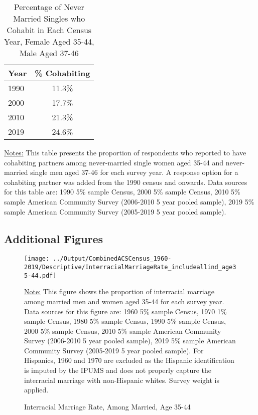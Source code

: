 \begin{table}[H] \caption{Percentage of Never Married Singles who Cohabit in Each Census Year, Female Aged 35-44, Male Aged 37-46} \label{apptab:cohabit}
\begin{tabular}{lc}
	\toprule
	Year & \% Cohabiting \\ \midrule 
1990 & 11.3\% 	\\
2000 & 17.7\%  \\
2010 & 21.3\%  \\
2019 & 24.6\%  \\ \bottomrule 
\end{tabular}
\begin{center}
\begin{minipage}{17cm}
\begin{spacing}{0.9}
{\footnotesize{\underline{Notes:} This table presents the proportion of respondents who reported to have cohabiting partners among never-married single women aged 35-44 and never-married single men aged 37-46 for each survey year. A response option for a cohabiting partner was added from the 1990 census and onwards. Data sources for this table are: 1990 5\% sample Census, 2000 5\% sample Census, 2010 5\% sample American Community Survey (2006-2010 5 year pooled sample), 2019 5\% sample American Community Survey (2005-2019 5 year pooled sample). }}
\end{spacing}
\end{minipage}
\end{center}
\end{table}


\subsection{Additional Figures} \label{appsec:figures}



\begin{figure}[H] \caption{Interracial Marriage Rate, Among Married, Age 35-44} \label{fig:intmarriage-allpeople}
	 \texttt{[image: ../Output/CombinedACSCensus\_1960-2019/Descriptive/InterracialMarriageRate\_includeallind\_age35-44.pdf]}
\begin{fignote}
	\underline{Note:} This figure shows the proportion of interracial marriage among married men and women aged 35-44 for each survey year. Data sources for this figure are: 1960 5\% sample Census, 1970 1\% sample Census, 1980 5\% sample Census, 1990 5\% sample Census, 2000 5\% sample Census, 2010 5\% sample American Community Survey (2006-2010 5 year pooled sample), 2019 5\% sample American Community Survey (2005-2019 5 year pooled sample). For Hispanics, 1960 and 1970 are excluded as the Hispanic identification is imputed by the IPUMS and does not properly capture the interracial marriage with non-Hispanic whites. Survey weight is applied. 
\end{fignote}

\end{figure}

